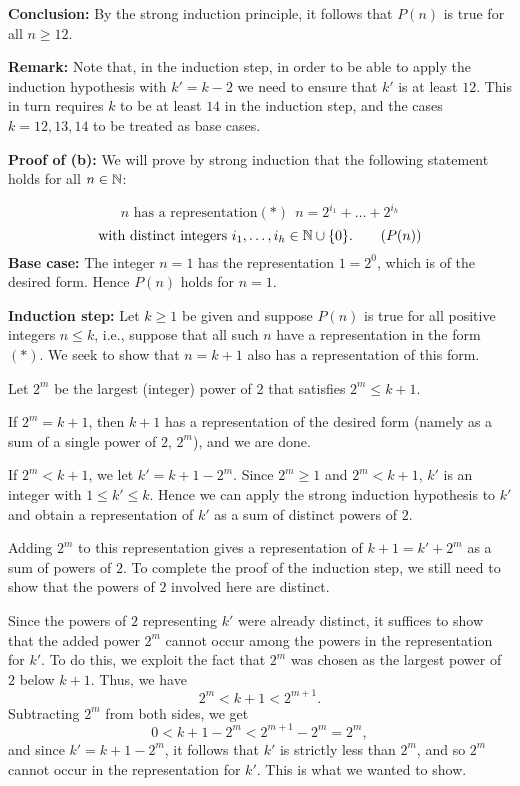 \textbf{Conclusion:} By the strong induction principle, 
it follows that $P(n)$  is true for all $n\ge12$.

\bigskip

\textbf{Remark:} Note that, in the induction step, in order to be able
to apply the induction hypothesis with $k'=k-2$ we need to ensure that 
$k'$ is at least $12$. This in turn requires $k$ 
to be at least $14$ in the induction step,
and the cases $k=12,13,14$ to be treated as base
cases.


\textbf{Proof of (b):}
We will prove by strong induction that the following statement  
holds for all $n\in\mathbb{N}$:

\[\text{$n$ has a representation}(*) ~~n=2^{i_1}+\dots + 2^{i_h} \]
\[ \text{with distinct integers $i_1,\dots,i_h\in\mathbb{N}\cup\{0\}$.}
\tag{$P(n)$}
\]
\textbf{Base case:} The integer $n=1$ has the representation $1=2^0$,
which is of the desired form. Hence $P(n)$ holds for $n=1$.


\textbf{Induction step:} 
Let $k\ge1$ be given and suppose $P(n)$ is true for all positive
integers $ n\le k$, i.e., suppose that all such $n$ have a
representation in the form $(*)$. We seek to show that $n=k+1$ also has a
representation of this form. 

Let $2^m$ be the largest (integer) power of $2$ that satisfies $2^m\le k+1$.

If $2^m=k+1$, then $k+1$ has a representation of the desired form
(namely as a sum of a single power of $2$, $2^m$), and we are done.

If $2^m<k+1$, we let $k'=k+1-2^m$.  Since $2^m\ge1$
and $2^m<k+1$, $k'$ is an integer with $1\le k'\le k$. 
Hence we can apply the strong induction hypothesis to $k'$ and obtain a
representation of $k'$ as a sum of distinct powers of $2$.

Adding $2^m$ to this representation gives a representation of $k+1=k'+2^m$
as a sum of powers of $2$. To complete the proof of the induction step,
we still need to show that the powers of $2$ involved here are distinct.

Since the powers of $2$ representing $k'$ were already distinct, it
suffices to show that the added power $2^m$ cannot occur among the
powers in the representation for $k'$. 
To do this, we exploit the fact that $2^m$ was chosen as the largest
power of $2$ below $k+1$. Thus, we have
\[
2^m< k+1 < 2^{m+1}.
\]
Subtracting $2^m$ from both sides, we get 
\[
0< k+1-2^m<2^{m+1}-2^m=2^m,
\]
and since $k'=k+1-2^m$, it follows that $k'$ is strictly less than
$2^m$, and so $2^m$ cannot occur in the representation for $k'$.
This is what we wanted to show.


